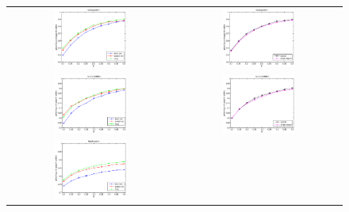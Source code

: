 \begin{figure}[htbp]
  \begin{center}
    \begin{tabular}{cc}
      \includegraphics[width=0.45\textwidth]{error_pos_SV.eps} &
      \includegraphics[width=0.45\textwidth]{error_cmp_pos_SV.eps} \\
      \includegraphics[width=0.45\textwidth]{error_ori_SV.eps} &
      \includegraphics[width=0.45\textwidth]{error_cmp_ori_SV.eps} \\
      \includegraphics[width=0.45\textwidth]{error_pst_SV.eps} &

\end{tabular}
\end{center}
\end{figure}
